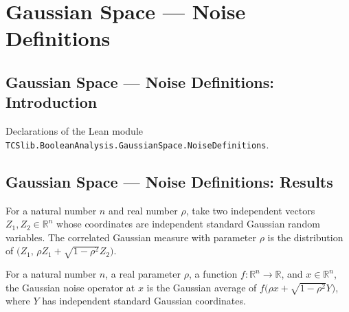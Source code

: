 \section{Gaussian Space --- Noise Definitions}
\subsection*{Gaussian Space --- Noise Definitions: Introduction}

Declarations of the Lean module \texttt{TCSlib.BooleanAnalysis.GaussianSpace.NoiseDefinitions}.

\subsection*{Gaussian Space --- Noise Definitions: Results}

\begin{definition}
\label{BooleanAnalysis.GaussianSpace.correlatedGaussianMeasure}
\leanok
{}
For a natural number $n$ and real number $\rho$, take two independent vectors
$Z_1,Z_2\in\mathbb{R}^n$ whose coordinates are independent standard Gaussian random
variables. The correlated Gaussian measure with parameter $\rho$ is the distribution of
$\bigl(Z_1,\,\rho Z_1+\sqrt{1-\rho^2}Z_2\bigr)$.
\end{definition}

\begin{definition}
\label{BooleanAnalysis.GaussianSpace.gaussianNoise}
\leanok
{}
For a natural number $n$, a real parameter $\rho$, a function
$f:\mathbb{R}^n\to\mathbb{R}$, and $x\in\mathbb{R}^n$, the Gaussian noise operator
at $x$ is the Gaussian average of $f\bigl(\rho x+\sqrt{1-\rho^2}Y\bigr)$, where $Y$
has independent standard Gaussian coordinates.
\end{definition}

